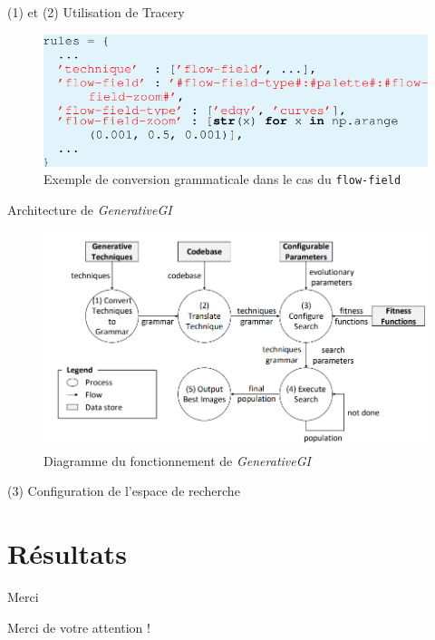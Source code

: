 \documentclass[aspectratio=169]{beamer}
\begin{document}
\begin{frame}{(1) et (2) Utilisation de Tracery}
    \begin{figure}
        \centering
        \includegraphics[scale=0.4]{fig/grammar.png}
        \caption{Exemple de conversion grammaticale dans le cas du \texttt{flow-field}}
    \end{figure}
\end{frame}

\begin{frame}{Architecture de \textit{GenerativeGI}}
    \begin{figure}
        \centering
        \includegraphics[scale=0.4]{fig/archi.png}
        \caption{Diagramme du fonctionnement de \textit{GenerativeGI}}
    \end{figure}
\end{frame}

\begin{frame}{(3) Configuration de l'espace de recherche}
    
\end{frame}

\section{Résultats}

\begin{frame}{Merci}
    \begin{center}
        Merci de votre attention !
    \end{center}
\end{frame}
    
\end{document}
